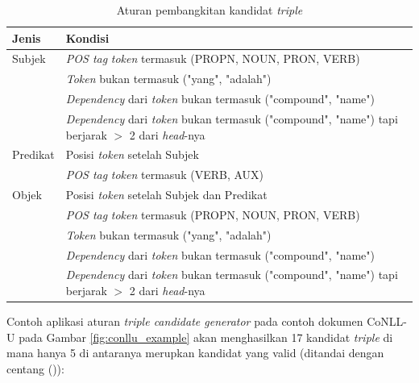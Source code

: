 \begin{table}
\renewcommand{\arraystretch}{1.5}
\caption{Aturan pembangkitan kandidat \textit{triple}}
\label{tab:triple_candidate_generation_rules}
\centering
\begin{tabular}{l p{12cm}}
\hline
\textbf{Jenis} & \textbf{Kondisi} \\
\hline
Subjek & \textit{POS tag} \textit{token} termasuk (PROPN, NOUN, PRON, VERB) \\
\space & \textit{Token} bukan termasuk ("yang", "adalah") \\
\space & \textit{Dependency} dari \textit{token} bukan termasuk ("compound", "name") \\
\space & \textit{Dependency} dari \textit{token} bukan termasuk ("compound", "name") tapi berjarak $>$ 2 dari \textit{head}-nya \\
\hline
Predikat & Posisi \textit{token} setelah Subjek \\
\space & \textit{POS tag} \textit{token} termasuk (VERB, AUX) \\
\hline
Objek & Posisi \textit{token} setelah Subjek dan Predikat \\
\space & \textit{POS tag} \textit{token} termasuk (PROPN, NOUN, PRON, VERB) \\
\space & \textit{Token} bukan termasuk ("yang", "adalah") \\
\space & \textit{Dependency} dari \textit{token} bukan termasuk ("compound", "name") \\
\space & \textit{Dependency} dari \textit{token} bukan termasuk ("compound", "name") tapi berjarak $>$ 2 dari \textit{head}-nya \\

\end{tabular}
\end{table}

Contoh aplikasi aturan \textit{triple candidate generator} pada contoh dokumen CoNLL-U pada Gambar \ref{fig:conllu_example} akan menghasilkan 17 kandidat \textit{triple} di mana hanya 5 di antaranya merupkan kandidat yang valid (ditandai dengan centang ()):

